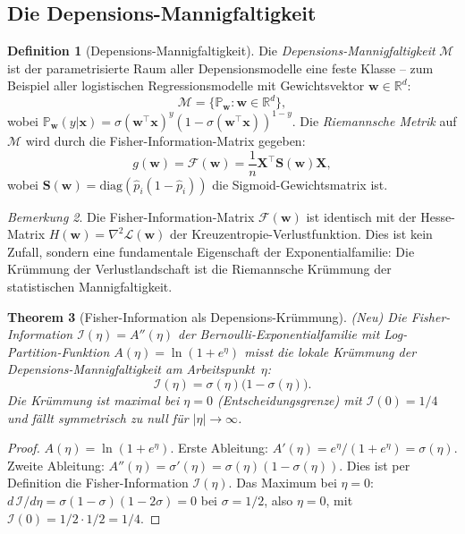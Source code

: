 ﻿\documentclass[12pt, a4paper]{article}
\newtheorem{theorem}{Theorem}[section]
\theoremstyle{definition}
\newtheorem{definition}[theorem]{Definition}
\theoremstyle{remark}
\newtheorem{remark}[theorem]{Bemerkung}
\newcommand{\R}{\mathbb{R}}
\newcommand{\Prob}{\mathbb{P}}
\newcommand{\sigmoid}{\sigma}
\newcommand{\vw}{\bm{w}}
\newcommand{\vx}{\bm{x}}
\newcommand{\vX}{\bm{X}}
\newcommand{\vS}{\bm{S}}
\newcommand{\T}{\top}
\newcommand{\diag}{\mathrm{diag}}
\begin{document}
\subsection{Die Depensions-Mannigfaltigkeit}

\begin{definition}[Depensions-Mannigfaltigkeit]
\label{def:manifold}
Die \emph{Depensions-Mannigfaltigkeit} $\mathcal{M}$ ist der parametrisierte Raum
aller Depensionsmodelle eine feste Klasse -- zum Beispiel aller logistischen
Regressionsmodelle mit Gewichtsvektor $\vw \in \R^d$:
\[
  \mathcal{M} = \bigl\{\Prob_{\vw} : \vw \in \R^d\bigr\},
\]
wobei $\Prob_{\vw}(y|\vx) = \sigmoid(\vw^\T\vx)^y (1-\sigmoid(\vw^\T\vx))^{1-y}$.
Die \emph{Riemannsche Metrik} auf $\mathcal{M}$ wird durch die
Fisher-Information-Matrix gegeben:
\begin{equation}
  g(\vw) = \mathcal{F}(\vw) = \frac{1}{n}\vX^\T\vS(\vw)\vX,
  \label{eq:fisher}
\end{equation}
wobei $\vS(\vw) = \diag(\hat{p}_i(1-\hat{p}_i))$ die Sigmoid-Gewichtsmatrix ist.
\end{definition}

\begin{remark}
Die Fisher-Information-Matrix $\mathcal{F}(\vw)$ ist identisch mit der Hesse-Matrix
$H(\vw) = \nabla^2\mathcal{L}(\vw)$ der Kreuzentropie-Verlustfunktion. Dies ist
kein Zufall, sondern eine fundamentale Eigenschaft der Exponentialfamilie: Die
Krümmung der Verlustlandschaft ist die Riemannsche Krümmung der statistischen
Mannigfaltigkeit.
\end{remark}

\begin{theorem}[Fisher-Information als Depensions-Krümmung]
\label{thm:fisher_kruemmung}
\textup{(Neu)} Die Fisher-Infor\-mation $\mathcal{I}(\eta) = A''(\eta)$ der
Bernoulli-Exponentialfamilie mit Log-Partition-Funktion $A(\eta) = \ln(1+e^\eta)$
misst die lokale Krümmung der Depensions-Mann\-ig\-fal\-tig\-keit am Arbeitspunkt~$\eta$:
\begin{equation}
  \mathcal{I}(\eta) = \sigmoid(\eta)\bigl(1-\sigmoid(\eta)\bigr).
  \label{eq:fisher_info}
\end{equation}
Die Krümmung ist maximal bei $\eta = 0$ (Entscheidungsgrenze) mit $\mathcal{I}(0) = 1/4$
und fällt symmetrisch zu null für $|\eta| \to \infty$.
\end{theorem}

\begin{proof}
  $A(\eta) = \ln(1+e^\eta)$. Erste Ableitung: $A'(\eta) = e^\eta/(1+e^\eta) = \sigmoid(\eta)$.
  Zweite Ableitung: $A''(\eta) = \sigmoid'(\eta) = \sigmoid(\eta)(1-\sigmoid(\eta))$.
  Dies ist per Definition die Fisher-Information $\mathcal{I}(\eta)$. Das Maximum
  bei $\eta=0$: $d\,\mathcal{I}/d\eta = \sigmoid(1-\sigmoid)(1-2\sigmoid) = 0$
  bei $\sigmoid = 1/2$, also $\eta = 0$, mit $\mathcal{I}(0) = 1/2 \cdot 1/2 = 1/4$. \qedhere
\end{proof}
\end{document}
